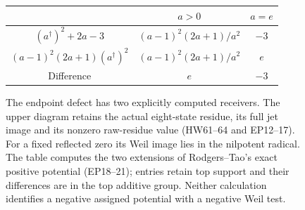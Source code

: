 \begin{figure}[p]
\centering
{}
\medskip
\begin{tabular}{c|c|c}
 & $a>0$ & $a=e$\\\hline
 $(a^\dagger)^2+2a-3$ & $(a-1)^2(2a+1)/a^2$ & $-3$\\[3pt]
 $(a-1)^2(2a+1)(a^\dagger)^2$ & $(a-1)^2(2a+1)/a^2$ & $e$\\[3pt]
 Difference & $e$ & $-3$
\end{tabular}
\caption{The endpoint defect has two explicitly computed receivers.
The upper diagram retains the actual eight-state residue, its full
jet image and its nonzero raw-residue value (HW61--64 and EP12--17).
For a fixed reflected zero its Weil image lies in the nilpotent radical.
The table computes the two extensions of Rodgers--Tao's exact
positive potential (EP18--21); entries retain top support and their
differences are in the top additive group. Neither calculation
identifies a negative assigned potential with a negative Weil test.}
\end{figure}
